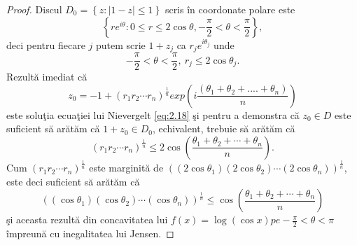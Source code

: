 \documentclass[a4paper,12pt,oneside]{report}
\begin{document}
\begin{proof}
Discul \(D_{0} = \left \{ z : \left | 1 - z \right |\leq 1 \right \}\) scris \^{i}n coordonate polare este
\begin{displaymath}
    \left \{ re^{i\theta }: 0 \leq r\leq 2\cos\theta , -\frac{\pi }{2}< \theta  < \frac{\pi }{2} \right \},
\end{displaymath}
deci pentru fiecare \(j\) putem scrie \(1 + z_{j}\) ca \(r_{j}e^{i\theta _{j}}\) unde \[-\frac{\pi }{2}< \theta  < \frac{\pi }{2},~r_{j}\leq 2\cos\theta _{j}.\]
 Rezult\u{a} imediat c\u{a} \[z_{0} = -1 + \left ( r_{1} r_{2}\cdots r_{n}\right )^{\frac{1}{n}}exp\left ( i\frac{\left ( \theta _{1} + \theta _{2} +....+ \theta _{n} \right )}{n} \right )\] este solu\c{t}ia ecua\c{t}iei lui Nievergelt \ref{eq:2.18} \c{s}i pentru a demonstra c\u{a} \(z_{0}\in D \) este suficient s\u{a} ar\u{a}t\u{a}m c\u{a} \(1 + z_{0}\in D_{0}\), echivalent, trebuie s\u{a} ar\u{a}t\u{a}m c\u{a}
\begin{displaymath}
    \left ( r_{1} r_{2} \cdots r_{n}\right )^{\frac{1}{n}}\leq 2\cos\left ( \frac{\theta _{1} + \theta _{2}+\cdots+\theta _{n}}{n} \right ) \label{eq:2.19} \tag{2.19}.
\end{displaymath}
Cum \(\left ( r_{1} r_{2} \cdots r_{n}\right )^{\frac{1}{n}}\) este marginit\u{a} de \(\left ( \left (2\cos\theta _{1}  \right )\left ( 2\cos\theta _{2} \right )\cdots \left (2\cos\theta _{n}  \right ) \right )^{\frac{1}{n}}\), este deci suficient s\u{a} ar\u{a}t\u{a}m c\u{a}
\begin{displaymath}
    \left ( \left (\cos\theta _{1}  \right )\left ( \cos\theta _{2} \right )\cdots \left (\cos\theta _{n}  \right ) \right )^{\frac{1}{n}}\leq \cos\left ( \frac{\theta _{1} + \theta _{2}+\cdots+\theta _{n}}{n} \right )
\end{displaymath}
\c{s}i aceasta rezult\u{a} din concavitatea lui \(f\left ( x \right ) = \log \left ( \cos x \right ) pe -\frac{\pi }{2}< \theta < \pi\) \^{i}mpreun\u{a} cu inegalitatea lui Jensen.
\end{proof}
\end{document}
